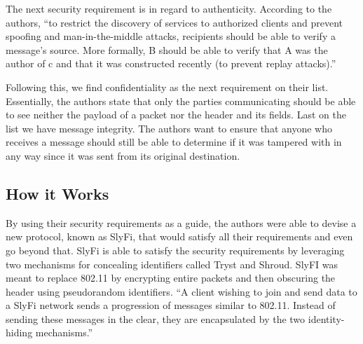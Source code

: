 \smallskip

The next security requirement is in regard to authenticity. According to the authors, “to restrict the discovery of services to authorized clients and prevent spoofing and man-in-the-middle attacks, recipients should be able to verify a message’s source. More formally, B should be able to verify that A was the author of c and that it was constructed recently (to prevent replay attacks).” \cite {greenstein2008improving}

\smallskip

Following this, we find confidentiality as the next requirement on their list. Essentially, the authors state that only the parties communicating should be able to see neither the payload of a packet nor the header and its fields. Last on the list we have message integrity. The authors want to ensure that anyone who receives a message should still be able to determine if it was tampered with in any way since it was sent from its original destination. 

\subsection {How it Works}

By using their security requirements as a guide, the authors were able to devise a new protocol, known as SlyFi, that would satisfy all their requirements and even go beyond that. SlyFi is able to satisfy the security requirements by leveraging two mechanisms for concealing identifiers called Tryst and Shroud. SlyFI was meant to replace 802.11 by encrypting entire packets and then obscuring the header using pseudorandom identifiers. “A client wishing to join and send data to a SlyFi network sends a progression of messages similar to 802.11. Instead of sending these messages in the clear, they are encapsulated by the two identity-hiding mechanisms.” \cite {greenstein2008improving} 

\smallskip

